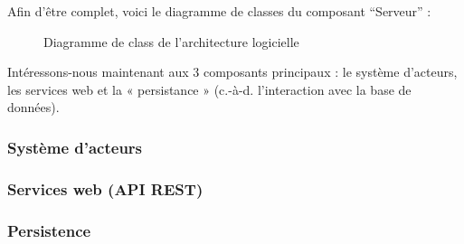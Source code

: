 Afin d’être complet, voici le diagramme de classes du composant “Serveur” :
\begin{figure}[H]
    \begin{center}

        \caption{Diagramme de class de l'architecture logicielle}
    \end{center}
\end{figure}

Intéressons-nous maintenant aux 3 composants principaux : le système d’acteurs, les services web et la « persistance » (c.-à-d. l’interaction avec la base de données).
\subsubsection{Système d'acteurs}\label{systeme-acteurs}
\subsubsection{Services web (API REST)}
\subsubsection{Persistence}